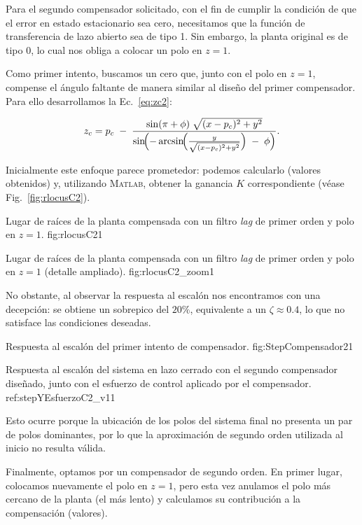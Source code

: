 Para el segundo compensador solicitado, con el fin de cumplir la condición de que el error en estado estacionario sea cero, necesitamos que la función de transferencia de lazo abierto sea de tipo 1. Sin embargo, la planta original es de tipo 0, lo cual nos obliga a colocar un polo en $z=1$.

Como primer intento, buscamos un cero que, junto con el polo en $z=1$, compense el ángulo faltante de manera similar al diseño del primer compensador. Para ello desarrollamos la Ec.~\eqref{eq:zc2}:

\begin{equation}
	\label{eq:zc2}
	z_c
	= p_c \;-\;
	\frac{
		\sin(\pi + \phi)\;
		\sqrt{(x - p_c)^2 + y^2}
	}{
		\sin\!\Bigl(
		-\arcsin\!\Bigl(\frac{y}{\sqrt{(x - p_c)^2 + y^2}}\Bigr)\;-\;\phi
		\Bigr)
	}.
\end{equation}

Inicialmente este enfoque parece prometedor: podemos calcularlo (valores obtenidos) y, utilizando \textsc{Matlab}, obtener la ganancia $K$ correspondiente (véase Fig.~\ref{fig:rlocusC2}).

{Lugar de raíces de la planta compensada con un filtro \emph{lag} de primer orden y polo en $z=1$.}
{fig:rlocusC2}{1}

{Lugar de raíces de la planta compensada con un filtro \emph{lag} de primer orden y polo en $z=1$ (detalle ampliado).}
{fig:rlocusC2_zoom}{1}

No obstante, al observar la respuesta al escalón nos encontramos con una decepción: se obtiene un sobrepico del $20\%$, equivalente a un $\zeta \approx 0.4$, lo que no satisface las condiciones deseadas.

{Respuesta al escalón del primer intento de compensador.}
{fig:StepCompensador2}{1}

{Respuesta al escal\'on del sistema en lazo cerrado con el segundo compensador dise\~nado, junto con el esfuerzo de control aplicado por el compensador.}
{ref:stepYEsfuerzoC2_v1}{1}

Esto ocurre porque la ubicación de los polos del sistema final no presenta un par de polos dominantes, por lo que la aproximación de segundo orden utilizada al inicio no resulta válida.

Finalmente, optamos por un compensador de segundo orden. En primer lugar, colocamos nuevamente el polo en $z=1$, pero esta vez anulamos el polo más cercano de la planta (el más lento) y calculamos su contribución a la compensación (valores).

